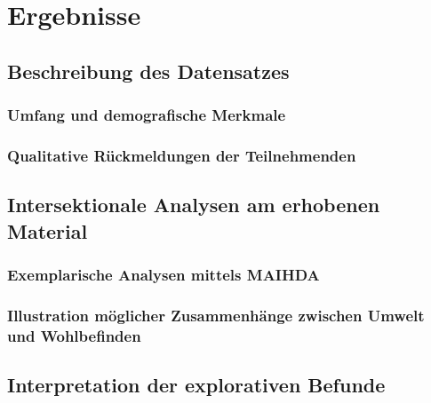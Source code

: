 
\section{Ergebnisse} \label{sec:ergebnisse}

\subsection{Beschreibung des Datensatzes}

\subsubsection{Umfang und demografische Merkmale}

\subsubsection{Qualitative Rückmeldungen der Teilnehmenden}

\subsection{Intersektionale Analysen am erhobenen Material}

\subsubsection{Exemplarische Analysen mittels MAIHDA}

\subsubsection{Illustration möglicher Zusammenhänge zwischen Umwelt und Wohlbefinden}

\subsection{Interpretation der explorativen Befunde}
